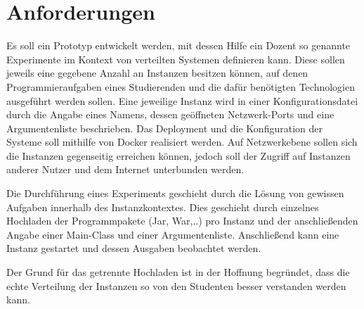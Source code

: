 \section{Anforderungen}
Es soll ein Prototyp entwickelt werden, mit dessen Hilfe ein Dozent so genannte Experimente im Kontext von verteilten Systemen definieren kann.
Diese sollen jeweils eine gegebene Anzahl an Instanzen besitzen können, auf denen Programmieraufgaben eines Studierenden und die dafür benötigten Technologien ausgeführt werden sollen.
Eine jeweilige Instanz wird in einer Konfigurationsdatei durch die Angabe eines Namens, dessen geöffneten Netzwerk-Ports und eine Argumentenliste beschrieben.
Das Deployment und die Konfiguration der Systeme soll mithilfe von Docker realisiert werden.
Auf Netzwerkebene sollen sich die Instanzen gegenseitig erreichen können, jedoch soll der Zugriff auf Instanzen anderer Nutzer und dem Internet unterbunden werden.
\par
Die Durchführung eines Experiments geschieht durch die Lösung von gewissen Aufgaben innerhalb des Instanzkontextes.
Dies geschieht durch einzelnes Hochladen der Programmpakete (Jar, War,..) pro Instanz und der anschließenden Angabe einer Main-Class und einer Argumentenliste.
Anschließend kann eine Instanz gestartet und dessen Ausgaben beobachtet werden.
\par
Der Grund für das getrennte Hochladen ist in der Hoffnung begründet, dass die echte Verteilung der Instanzen so von den Studenten besser verstanden werden kann.

